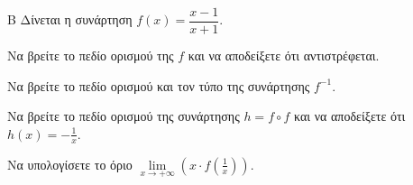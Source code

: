 \begin{thema}{Β}
Δίνεται η συνάρτηση $f(x) = \dfrac{x-1}{x+1}$.
\begin{erwthma}
\item Να βρείτε το πεδίο ορισμού της $f$ και να αποδείξετε ότι αντιστρέφεται.
\item Να βρείτε το πεδίο ορισμού και τον τύπο της συνάρτησης $f^{-1}$.
\item Να βρείτε το πεδίο ορισμού της συνάρτησης $h = f \circ f$ και να αποδείξετε ότι $h(x) = -\frac{1}{x}$.
\item Να υπολογίσετε το όριο $\lim\limits_{x \to +\infty} \left( x \cdot f\left(\frac{1}{x}\right) \right)$.
\end{erwthma}
\end{thema}
